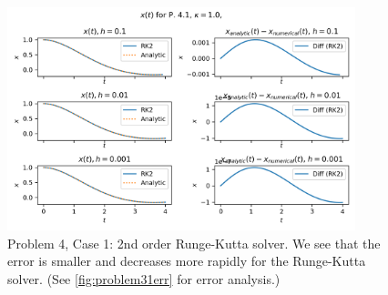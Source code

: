 \documentclass[10pt,letterpaper,notitlepage]{article}
\begin{document}
    \begin{figure}[h]
        \centering
        \includegraphics[width=0.9\textwidth]{../figures/p41.png}
        \caption{Problem 4, Case 1: 2nd order Runge-Kutta solver. We see that the error is smaller and decreases more rapidly for the Runge-Kutta solver. (See \cref{fig:problem31err} for error analysis.)}
    \end{figure}
 
\end{document}

